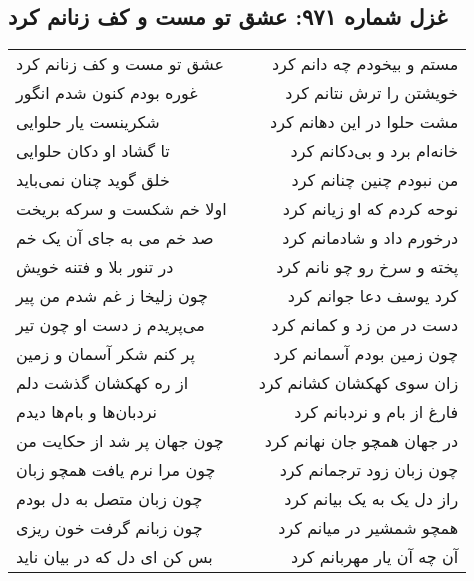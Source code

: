 \begin{center}
\section*{غزل شماره ۹۷۱: عشق تو مست و کف زنانم کرد}
\label{sec:0971}
\begin{longtable}{l p{0.5cm} r}
عشق تو مست و کف زنانم کرد
&&
مستم و بیخودم چه دانم کرد
\\
غوره بودم کنون شدم انگور
&&
خویشتن را ترش نتانم کرد
\\
شکرینست یار حلوایی
&&
مشت حلوا در این دهانم کرد
\\
تا گشاد او دکان حلوایی
&&
خانه‌ام برد و بی‌دکانم کرد
\\
خلق گوید چنان نمی‌باید
&&
من نبودم چنین چنانم کرد
\\
اولا خم شکست و سرکه بریخت
&&
نوحه کردم که او زیانم کرد
\\
صد خم می به جای آن یک خم
&&
درخورم داد و شادمانم کرد
\\
در تنور بلا و فتنه خویش
&&
پخته و سرخ رو چو نانم کرد
\\
چون زلیخا ز غم شدم من پیر
&&
کرد یوسف دعا جوانم کرد
\\
می‌پریدم ز دست او چون تیر
&&
دست در من زد و کمانم کرد
\\
پر کنم شکر آسمان و زمین
&&
چون زمین بودم آسمانم کرد
\\
از ره کهکشان گذشت دلم
&&
زان سوی کهکشان کشانم کرد
\\
نردبان‌ها و بام‌ها دیدم
&&
فارغ از بام و نردبانم کرد
\\
چون جهان پر شد از حکایت من
&&
در جهان همچو جان نهانم کرد
\\
چون مرا نرم یافت همچو زبان
&&
چون زبان زود ترجمانم کرد
\\
چون زبان متصل به دل بودم
&&
راز دل یک به یک بیانم کرد
\\
چون زبانم گرفت خون ریزی
&&
همچو شمشیر در میانم کرد
\\
بس کن ای دل که در بیان ناید
&&
آن چه آن یار مهربانم کرد
\\
\end{longtable}
\end{center}
